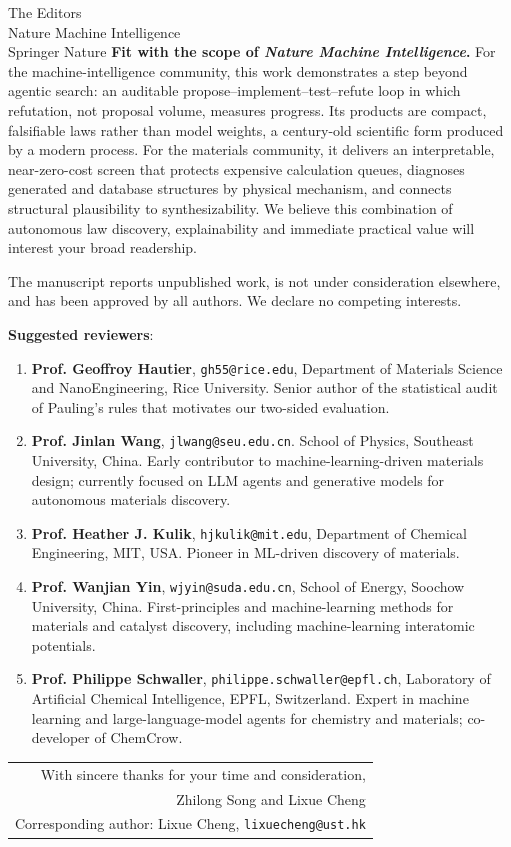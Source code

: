 \documentclass[11pt,a4paper]{letter}
\begin{document}
\begin{letter}{The Editors\\Nature Machine Intelligence\\Springer Nature}
\textbf{Fit with the scope of \emph{Nature Machine Intelligence}.}
For the machine-intelligence community, this work demonstrates a step beyond agentic search: an auditable propose--implement--test--refute loop in which refutation, not proposal volume, measures progress. Its products are compact, falsifiable laws rather than model weights, a century-old scientific form produced by a modern process. For the materials community, it delivers an interpretable, near-zero-cost screen that protects expensive calculation queues, diagnoses generated and database structures by physical mechanism, and connects structural plausibility to synthesizability. We believe this combination of autonomous law discovery, explainability and immediate practical value will interest your broad readership.

The manuscript reports unpublished work, is not under consideration elsewhere, and has been approved by all authors. We declare no competing interests.

\textbf{Suggested reviewers}:

\begin{enumerate}\itemsep0pt
\item \textbf{Prof. Geoffroy Hautier}, \texttt{gh55@rice.edu}, Department of Materials Science and NanoEngineering, Rice University. Senior author of the statistical audit of Pauling's rules that motivates our two-sided evaluation.
\item \textbf{Prof. Jinlan Wang}, \texttt{jlwang@seu.edu.cn}. School of Physics, Southeast University, China. Early contributor to machine-learning-driven materials design; currently focused on LLM agents and generative models for autonomous materials discovery.
\item \textbf{Prof. Heather J. Kulik}, \texttt{hjkulik@mit.edu},
Department of Chemical Engineering, MIT, USA. Pioneer in ML-driven discovery of materials.
\item \textbf{Prof. Wanjian Yin}, \texttt{wjyin@suda.edu.cn},
School of Energy, Soochow University, China. First-principles and machine-learning methods for materials and catalyst discovery, including machine-learning interatomic potentials.
\item \textbf{Prof. Philippe Schwaller}, \texttt{philippe.schwaller@epfl.ch}, Laboratory of Artificial Chemical Intelligence, EPFL, Switzerland. Expert in machine learning and large-language-model agents for chemistry and materials; co-developer of ChemCrow.
\end{enumerate}

\vspace{0.2em}
\noindent\hfill\begin{tabular}{@{}r@{}}
With sincere thanks for your time and consideration,\\[2.0em]
Zhilong Song and Lixue Cheng\\
{\footnotesize Corresponding author: Lixue Cheng, \texttt{lixuecheng@ust.hk}}
\end{tabular}

\end{letter}
\end{document}
